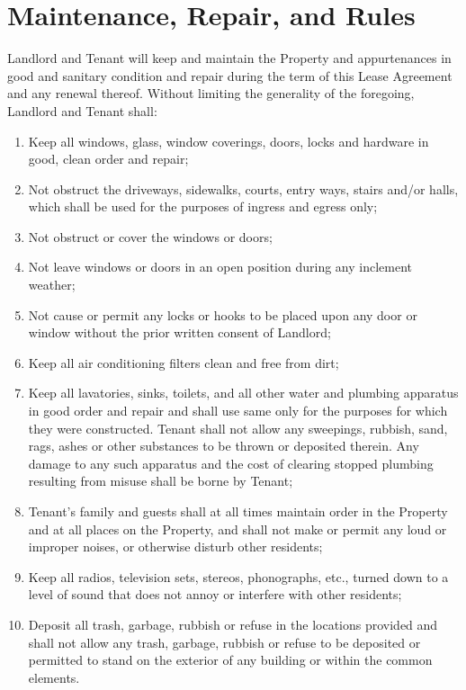 \documentclass{amsart}
\begin{document}
\section{Maintenance, Repair, and Rules}
Landlord and Tenant will keep and maintain the Property and
appurtenances in good and sanitary condition and repair during the term of this
Lease Agreement and any renewal thereof. Without limiting the generality of the
foregoing, Landlord and Tenant shall:
\begin{enumerate}
    \item Keep all windows, glass, window coverings, doors, locks and hardware
        in good, clean order and repair;
    \item Not obstruct the driveways, sidewalks, courts, entry ways, stairs
        and/or halls, which shall be used for the purposes of ingress and egress
        only;
    \item Not obstruct or cover the windows or doors;
    \item Not leave windows or doors in an open position during any inclement weather;
    \item Not cause or permit any locks or hooks to be placed upon any door or
        window without the prior written consent of Landlord;
    \item Keep all air conditioning filters clean and free from dirt; 
    \item Keep all lavatories, sinks, toilets, and all other water and plumbing
        apparatus in good order and repair and shall use same only for the
        purposes for which they were constructed. Tenant shall not allow any
        sweepings, rubbish, sand, rags, ashes or other substances to be thrown
        or deposited therein. Any damage to any such apparatus and the cost of
        clearing stopped plumbing resulting from misuse shall be borne by
        Tenant;
    \item Tenant's family and guests shall at all times maintain order in the
        Property and at all places on the Property, and shall not make or permit
        any loud or improper noises, or otherwise disturb other residents;
    \item Keep all radios, television sets, stereos, phonographs, etc., turned
        down to a level of sound that does not annoy or interfere with other
        residents;
    \item Deposit all trash, garbage, rubbish or refuse in the locations
        provided and shall not allow any trash, garbage, rubbish or refuse to be
        deposited or permitted to stand on the exterior of any building or
        within the common elements.
\end{enumerate}
\end{document}
